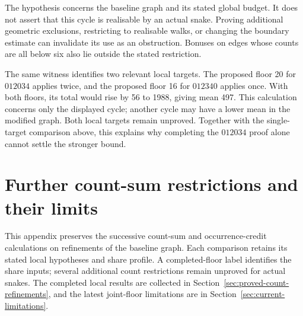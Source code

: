 \documentclass[11pt,a4paper]{article}
\theoremstyle{definition}
\theoremstyle{remark}
\begin{document}
The hypothesis concerns the baseline graph and its stated global budget.
It does not assert that this cycle is realisable by an actual snake. Proving
additional geometric exclusions, restricting to realisable walks, or changing
the boundary estimate can invalidate its use as an obstruction. Bonuses on
edges whose counts are all below six also lie outside the stated restriction.

The same witness identifies two relevant local targets. The proposed floor
20 for $012034$ applies twice, and the proposed floor 16 for $012340$ applies
once. With both floors, its total would rise by 56 to 1988, giving mean 497.
This calculation concerns only the displayed cycle; another cycle may have
a lower mean in the modified graph. Both local targets remain unproved.
Together with the single-target comparison above, this explains why completing
the $012034$ proof alone cannot settle the stronger bound.

\section{Further count-sum restrictions and their limits}\label{sec:sum-refinements}
This appendix preserves the successive count-sum and occurrence-credit
calculations on refinements of the baseline graph. Each comparison retains
its stated local hypotheses and share profile. A completed-floor label
identifies the share inputs; several additional count restrictions remain
unproved for actual snakes. The completed local results are collected in
Section~\ref{sec:proved-count-refinements}, and the latest joint-floor
limitations are in Section~\ref{sec:current-limitations}.
\end{document}
